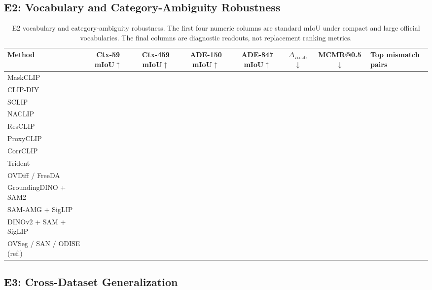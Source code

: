 \documentclass[11pt,a4paper]{article}
\newcommand{\up}{\ensuremath{\uparrow}}
\newcommand{\down}{\ensuremath{\downarrow}}
\begin{document}
\subsection{E2: Vocabulary and Category-Ambiguity Robustness}

\begin{table}[H]
\centering
\scriptsize
\caption{E2 vocabulary and category-ambiguity robustness. The first four numeric columns are standard mIoU under compact and large official vocabularies. The final columns are diagnostic readouts, not replacement ranking metrics.}
\label{tab:e2-ambiguity}
\setlength{\tabcolsep}{2.5pt}
\begin{adjustbox}{max width=\textwidth}
\begin{tabular}{l c c c c c c p{}}
\toprule
Method & Ctx-59 mIoU\up & Ctx-459 mIoU\up & ADE-150 mIoU\up & ADE-847 mIoU\up & $\Delta_{\mathrm{vocab}}$\down & MCMR@0.5\down & Top mismatch pairs \\
\midrule
MaskCLIP & & & & & & & \\
CLIP-DIY & & & & & & & \\
SCLIP & & & & & & & \\
NACLIP & & & & & & & \\
ResCLIP & & & & & & & \\
ProxyCLIP & & & & & & & \\
CorrCLIP & & & & & & & \\
Trident & & & & & & & \\
OVDiff / FreeDA & & & & & & & \\
GroundingDINO + SAM2 & & & & & & & \\
SAM-AMG + SigLIP & & & & & & & \\
DINOv2 + SAM + SigLIP & & & & & & & \\
OVSeg / SAN / ODISE (ref.) & & & & & & & \\
\bottomrule
\end{tabular}
\end{adjustbox}
\end{table}

\subsection{E3: Cross-Dataset Generalization}
\end{document}
